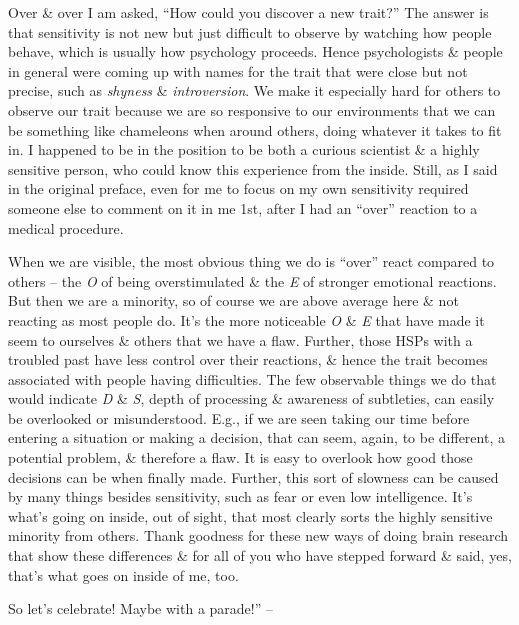 \documentclass{article}
\numberwithin{equation}{section}
\begin{document}
Over \& over I am asked, ``How could you discover a new trait?'' The answer is that sensitivity is not new but just difficult to observe by watching how people behave, which is usually how psychology proceeds. Hence psychologists \& people in general were coming up with names for the trait that were close but not precise, such as \textit{shyness} \& \textit{introversion}. We make it especially hard for others to observe our trait because we are so responsive to our environments that we can be something like chameleons when around others, doing whatever it takes to fit in. I happened to be in the position to be both a curious scientist \& a highly sensitive person, who could know this experience from the inside. Still, as I said in the original preface, even for me to focus on my own sensitivity required someone else to comment on it in me 1st, after I had an ``over'' reaction to a medical procedure.

When we are visible, the most obvious thing we do is ``over'' react compared to others -- the \textit{O} of being overstimulated \& the \textit{E} of stronger emotional reactions. But then we are a minority, so of course we are above average here \& not reacting as most people do. It's the more noticeable \textit{O} \& \textit{E} that have made it seem to ourselves \& others that we have a flaw. Further, those HSPs with a troubled past have less control over their reactions, \& hence the trait becomes associated with people having difficulties. The few observable things we do that would indicate \textit{D} \& \textit{S}, depth of processing \& awareness of subtleties, can easily be overlooked or misunderstood. E.g., if we are seen taking our time before entering a situation or making a decision, that can seem, again, to be different, a potential problem, \& therefore a flaw. It is easy to overlook how good those decisions can be when finally made. Further, this sort of slowness can be caused by many things besides sensitivity, such as fear or even low intelligence. It's what's going on inside, out of sight, that most clearly sorts the highly sensitive minority from others. Thank goodness for these new ways of doing brain research that show these differences \& for all of you who have stepped forward \& said, yes, that's what goes on inside of me, too.

So let's celebrate! Maybe with a parade!'' -- \cite[pp. 25--26]{Aron2013}

\end{document}
